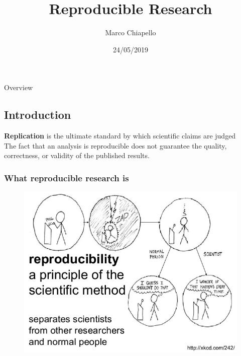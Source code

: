 \documentclass{beamer}
\title[Short title]{Reproducible Research}
\author{Marco Chiapello}
\institute[] 
{
\medskip
\textit{chiapello.m@gmail.com} 
}
\date{24/05/2019}
\begin{document}
\begin{frame}
\titlepage 
\end{frame}

\begin{frame}{Overview}
\small
\tableofcontents
\end{frame}


\begin{frame}
\section{Introduction} 
\vspace{50px}
\begin{flushright}
\scriptsize {\bf Replication} is the ultimate standard by which scientific claims are judged \citep{Peng:2011et}\\
\scriptsize The fact that an analysis is reproducible does not guarantee the quality, correctness, or validity of the published results. 
\end{flushright}
\end{frame}

\begin{frame}
\frametitle{What reproducible research is}
\begin{figure}
\includegraphics[scale=0.45]{figures/001.jpg}
\end{figure}
\end{frame}
\end{document}
